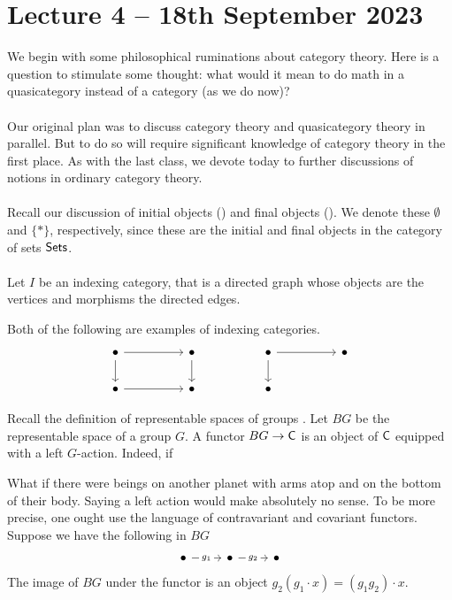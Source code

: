 \section{Lecture 4 -- 18th September 2023}
We begin with some philosophical ruminations about category theory. Here is a question to stimulate some thought: what would it mean to do math in a quasicategory instead of a category (as we do now)? 
\\\\
Our original plan was to discuss category theory and quasicategory theory in parallel. But to do so will require significant knowledge of category theory in the first place. As with the last class, we devote today to further discussions of notions in ordinary category theory. 
\\\\
Recall our discussion of initial objects () and final objects (). We denote these $\emptyset$ and $\{*\}$, respectively, since these are the initial and final objects in the category of sets $\mathsf{Sets}$. 
\\\\
Let $I$ be an indexing category, that is a directed graph whose objects are the vertices and morphisms the directed edges. 
\begin{example}
  Both of the following are examples of indexing categories. 
  $$%
  \begin{tikzcd}
    \bullet && \bullet && \bullet && \bullet \\
    \bullet && \bullet && \bullet
    \arrow[from=1-3, to=2-3]
    \arrow[from=1-1, to=2-1]
    \arrow[from=2-1, to=2-3]
    \arrow[from=1-1, to=1-3]
    \arrow[from=1-5, to=1-7]
    \arrow[from=1-5, to=2-5]
  \end{tikzcd}$$
\end{example}
\begin{example}
  Recall the definition of representable spaces of groups . Let $BG$ be the representable space of a group $G$. A functor $BG\to\mathsf{C}$ is an object of $\mathsf{C}$ equipped with a left $G$-action. Indeed, if 
\end{example}
\begin{remark}\label{rmk:top bottom beings}
  What if there were beings on another planet with arms atop and on the bottom of their body. Saying a left action would make absolutely no sense. To be more precise, one ought use the language of contravariant and covariant functors. Suppose we have the following in $BG$
  $$%
  \begin{tikzcd}
    \bullet & \bullet & \bullet
    \arrow["{g_{1}}"{description}, from=1-1, to=1-2]
    \arrow["{g_{2}}"{description}, from=1-2, to=1-3]
  \end{tikzcd}$$
  The image of $BG$ under the functor is an object $g_{2}(g_{1}\cdot x)=(g_{1}g_{2})\cdot x$. 
\end{remark}
